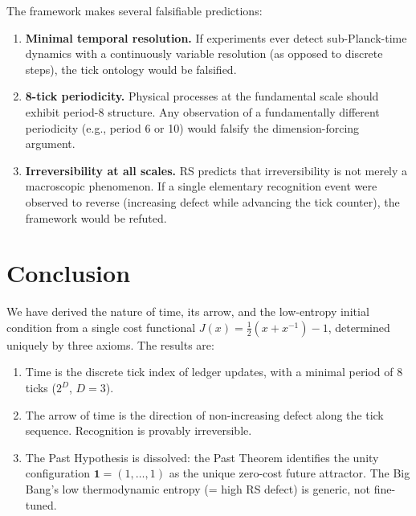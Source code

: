 \documentclass[12pt,a4paper]{article}
\theoremstyle{definition}
\theoremstyle{remark}
\begin{document}
The framework makes several falsifiable predictions:

\begin{enumerate}
  \item \textbf{Minimal temporal resolution.}  If experiments ever detect
  sub-Planck-time dynamics with a continuously variable resolution (as
  opposed to discrete steps), the tick ontology would be falsified.

  \item \textbf{8-tick periodicity.}  Physical processes at the
  fundamental scale should exhibit period-8 structure.  Any observation of
  a fundamentally different periodicity (e.g., period 6 or 10) would
  falsify the dimension-forcing argument.

  \item \textbf{Irreversibility at all scales.}  RS predicts that
  irreversibility is not merely a macroscopic phenomenon.  If a single
  elementary recognition event were observed to reverse (increasing defect
  while advancing the tick counter), the framework would be refuted.
\end{enumerate}

\section{Conclusion}
\label{sec:conclusion}

We have derived the nature of time, its arrow, and the low-entropy initial
condition from a single cost functional $J(x) = \tfrac{1}{2}(x + x^{-1}) - 1$,
determined uniquely by three axioms.  The results are:

\begin{enumerate}
  \item Time is the discrete tick index of ledger updates, with a minimal
  period of 8 ticks ($2^D$, $D = 3$).

  \item The arrow of time is the direction of non-increasing defect along
  the tick sequence.  Recognition is provably irreversible.

  \item The Past Hypothesis is dissolved: the Past Theorem identifies the
  unity configuration $\mathbf{1} = (1, \ldots, 1)$ as the unique zero-cost
  future attractor.  The Big Bang's low thermodynamic entropy (= high RS
  defect) is generic, not fine-tuned.
\end{enumerate}
\end{document}
